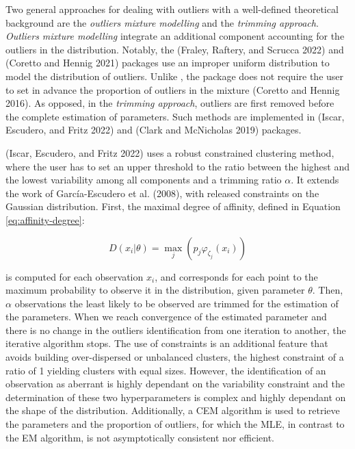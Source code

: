 Two general approaches for dealing with outliers with a well-defined
theoretical background are the \emph{outliers mixture modelling} and the
\emph{trimming approach}. \emph{Outliers mixture modelling} integrate an
additional component accounting for the outliers in the distribution.
Notably, the  (Fraley, Raftery, and Scrucca 2022) and  (Coretto and Hennig 2021)
packages use an improper uniform distribution to model the distribution
of outliers. Unlike , the  package does not
require the user to set in advance the proportion of outliers in the
mixture (Coretto and Hennig 2016). As opposed, in the \emph{trimming approach},
outliers are first removed before the complete estimation of parameters.
Such methods are implemented in  (Iscar, Escudero, and Fritz 2022) and
 (Clark and McNicholas 2019) packages.

 (Iscar, Escudero, and Fritz 2022) uses a robust constrained clustering
method, where the user has to set an upper threshold to the ratio
between the highest and the lowest variability among all components and
a trimming ratio \(\alpha\). It extends the work of
García-Escudero et al. (2008), with released constraints on the Gaussian
distribution. First, the maximal degree of affinity, defined in Equation
\eqref{eq:affinity-degree}:

\begin{equation}
    D(x_i|\theta)=\max_j \left(p_{j} \varphi_{\zeta_j} (x_i) \right)
\label{eq:affinity-degree}
\end{equation}

is computed for each observation \(x_i\), and corresponds for each point
to the maximum probability to observe it in the distribution, given
parameter \(\theta\). Then, \(\alpha\) observations the least likely to be
observed are trimmed for the estimation of the parameters. When we reach
convergence of the estimated parameter and there is no change in the
outliers identification from one iteration to another, the iterative
algorithm stops. The use of constraints is an additional feature that
avoids building over-dispersed or unbalanced clusters, the highest
constraint of a ratio of 1 yielding clusters with equal sizes. However,
the identification of an observation as aberrant is highly dependant on
the variability constraint and the determination of these two
hyperparameters is complex and highly dependant on the shape of the
distribution. Additionally, a CEM algorithm is used to retrieve the
parameters and the proportion of outliers, for which the MLE, in
contrast to the EM algorithm, is not asymptotically consistent nor
efficient.

